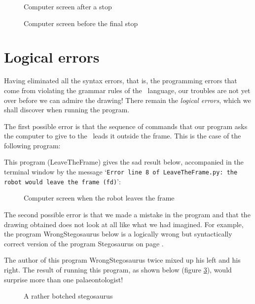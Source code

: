 \begin{figure}[p] %
 \caption{Com\-pu\-ter screen after a stop}\label{fig:ecran-stop}
\end{figure}

\begin{figure}[p] %
 \caption{Com\-pu\-ter screen before the final stop}
 \label{fig:ecran-arret}
\end{figure}

\section{Logical errors}

Having eliminated all the syntax errors, that is,
the programming errors that come from violating the grammar rules
of the \python\ language, our troubles are not yet over before we can
admire the \hbox{drawing!} There remain the
{\em logical errors},
which we shall discover when running the program.

The first possible error is that the sequence of commands that our
program asks the com\-pu\-ter to give to the \robot\ leads it
outside the frame. This is the case of the following program:

\noindent This program ({\idt LeaveTheFrame}) gives the sad result
below, accompanied in the terminal window by the message
`{\tt Error line 8 of LeaveTheFrame.py: the robot would leave the frame (fd)}':
\begin{figure}[htbp]
 \caption{Com\-pu\-ter screen when the robot leaves the frame}
\end{figure}

The second possible error is that we made a mistake in
the program and that the drawing obtained does not look at all like what
we had imagined. For example, the program {\idt WrongStegosaurus}
below is a logically wrong but syntactically
correct version of the program {\idt Stegosaurus} on page \pageref{prog:Stegosaure}.

The author of this program {\idt WrongStegosaurus} twice mixed up his left
and his right. The
result of running this program, as
shown
below
(figure \ref{fig:StegosaureErrone}), %
would sur\-prise more than one pa\-lae\-on\-tol\-o\-gist!
\begin{figure}[htbp]
 \caption{A rather botched stegosaurus}
 \label{fig:StegosaureErrone}
\end{figure}

